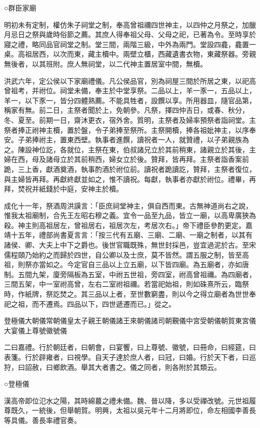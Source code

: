 ○群臣家廟

明初未有定制，權仿朱子祠堂之制，奉高曾祖禰四世神主，以四仲之月祭之，加臘月忌日之祭與歲時俗節之薦。其庶人得奉祖父母、父母之祀，已著為令。至時享於寢之禮，略同品官祠堂之制。堂三間，兩階三級，中外為兩門。堂設四龕，龕置一桌。高祖居西，以次而東，藏主櫝中。兩壁立櫃，西藏遺書衣物，東藏祭器。旁親無後者，以其班附。庶人無祠堂，以二代神主置居室中間，無櫝。

洪武六年，定公侯以下家廟禮儀。凡公侯品官，別為祠屋三間於所居之東，以祀高曾祖考，并祔位。祠堂未備，奉主於中堂享祭。二品以上，羊一豕一，五品以上，羊一，以下豕一，皆分四體熟薦。不能具牲者，設饌以享。所用器皿，隨官品第，稱家有無。前二日，主祭者聞於上，免朝參。凡祭，擇四仲吉日，或春、秋分，冬、夏至。前期一日，齋沐更衣，宿外舍。質明，主祭者及婦率預祭者詣祠堂。主祭者捧正祔神主櫝，置於盤，令子弟捧至祭所。主祭開櫝，捧各祖妣神主，以序奉安。子弟捧祔主，置東西壁。執事者進饌，讀祝者一人，就贊禮，以子弟親族為之。陳設神位訖，各就位，主祭在東，伯叔諸兄立於其前稍東，諸親立於其後，主婦在西，母及諸母立於其前稍西，婦女立於後。贊拜，皆再拜。主祭者詣香案前跪，三上香，獻酒奠酒，執事酌酒於祔位前。讀祝者跪讀訖，贊拜，主祭者復位，與主婦皆再拜。再獻終獻並如之，惟不讀祝。每獻，執事者亦獻於祔位。禮畢，再拜，焚祝并紙錢於中庭，安神主於櫝。

成化十一年，祭酒周洪謨言：「臣庶祠堂神主，俱自西而東。古無神道尚右之說，惟我太祖廟制，合先王左昭右穆之義。宜令一品至九品，皆立一廟，以高卑廣狹為殺。神主則高祖居左，曾祖居右，祖居次左，考居次右。」帝下禮臣參酌更定。嘉靖十五年，禮部尚書夏言言：「按三代有五廟、三廟、二廟、一廟之制者，以其有諸侯、卿、大夫上中下之爵也。後世官職既殊，無世封採邑，豈宜過泥於古。至宋儒程頤乃始約之而歸於四世，自公卿以及士庶，莫不皆然。謂五服之制，皆至高祖，則祭亦當如之。今定官自三品以上立五廟，以下皆四廟。為五廟者，亦如唐制。五間九架，廈旁隔板為五室，中祔五世祖，旁四室，祔高曾祖禰。為四廟者，三間五架，中一室祔高曾，左右二室祔祖禰。若當祀始祖，則如硃熹所云，臨祭時，作紙牌，祭訖焚之。其三品以上者，至世數窮盡，則以今之得立廟者為世世奉祀之祖，而不遷焉。四品以下，四世遞遷而已。」從之。

登極儀大朝儀常朝儀皇太子親王朝儀諸王來朝儀諸司朝覲儀中宮受朝儀朝賀東宮儀大宴儀上尊號徽號儀

二曰嘉禮。行於朝廷者，曰朝會，曰宴饗，曰上尊號、徽號，曰冊命，曰經筵，曰表箋。行於辟雍者，曰視學。自天子達於庶人者，曰冠，曰婚。行於天下者，曰巡狩，曰詔赦，曰鄉飲酒。舉其大者書之。儀之同者，則各附於其類云。

○登極儀

漢高帝即位氾水之陽，其時綿蕞之禮未備。魏、晉以降，多以受禪改號。元世祖履尊既久，一統後，但舉朝賀。明興，太祖以吳元年十二月將即位，命左相國李善長等具儀。善長率禮官奏。


